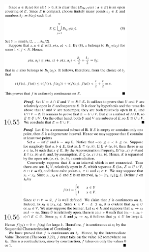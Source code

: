 \documentclass[3pt,landscape]{article}
\begin{document}
\begin{multicols}{3}
    \includegraphics[width=250]{10_52b.png} \\
    10.55
    \includegraphics[width=250]{10_55.png} \\
    10.56
    \includegraphics[width=250]{10_56a.png} \\
    \includegraphics[width=250]{10_56b.png} \\

\end{multicols}
\end{document}
